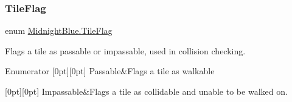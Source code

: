 \subsubsection{\texorpdfstring{Tile\+Flag}{TileFlag}}
{\footnotesize\ttfamily enum \hyperlink{namespace_midnight_blue_ad3f455dc6bab1e76768d1a468ae3e33b}{Midnight\+Blue.\+Tile\+Flag}\hspace{0.3cm}{\ttfamily [strong]}}



Flags a tile as passable or impassable, used in collision checking. 

\begin{DoxyEnumFields}{Enumerator}
[0pt][0pt]{}\hypertarget{namespace_midnight_blue_ad3f455dc6bab1e76768d1a468ae3e33ba01bb7f8bb1804fb74130d34c8c977a99}{}\label{namespace_midnight_blue_ad3f455dc6bab1e76768d1a468ae3e33ba01bb7f8bb1804fb74130d34c8c977a99} 
Passable&Flags a tile as walkable \\
\hline

[0pt][0pt]{}\hypertarget{namespace_midnight_blue_ad3f455dc6bab1e76768d1a468ae3e33ba02518d4f54df131d84d3b77bcb2bdce4}{}\label{namespace_midnight_blue_ad3f455dc6bab1e76768d1a468ae3e33ba02518d4f54df131d84d3b77bcb2bdce4} 
Impassable&Flags a tile as collidable and unable to be walked on. \\
\hline

\end{DoxyEnumFields}
